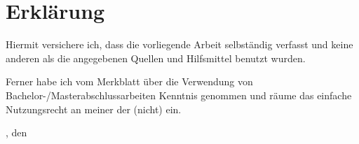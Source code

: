 
\chapter*{Erklärung}
Hiermit versichere ich, dass die vorliegende Arbeit selbständig verfasst und keine anderen als die angegebenen Quellen und Hilfsmittel benutzt wurden.

Ferner habe ich vom Merkblatt über die Verwendung von Bachelor-/Masterabschlussarbeiten \linebreak Kenntnis genommen und räume das einfache Nutzungsrecht an meiner \DocumentType{} der \University{} (nicht) ein.

\vspace{3cm}

\SubmissionLocation{}, den \SubmissionDate{}

\vspace{1cm}

\makebox[7cm]{\hrulefill}

\Author